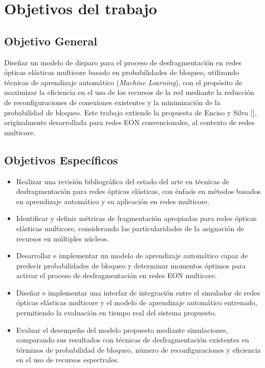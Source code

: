 \section{Objetivos del trabajo}
\subsection{Objetivo General}
Diseñar un modelo de disparo para el proceso de desfragmentación en redes ópticas elásticas multicore basado en probabilidades de bloqueo, utilizando técnicas de aprendizaje automático (\textit{Machine Learning}), con el propósito de maximizar la eficiencia en el uso de los recursos de la red mediante la reducción de reconfiguraciones de conexiones existentes y la minimización de la probabilidad de bloqueo. Este trabajo extiende la propuesta de Enciso y Silva [], originalmente desarrollada para redes EON convencionales, al contexto de redes multicore. 

\subsection{Objetivos Específicos}
\begin{itemize}
    \item Realizar una revisión bibliográfica del estado del arte en técnicas de desfragmentación para redes ópticas elásticas, con énfasis en métodos basados en aprendizaje automático y su aplicación en redes multicore.

    \item Identificar y definir métricas de fragmentación apropiadas para redes ópticas elásticas multicore, considerando las particularidades de la asignación de recursos en múltiples núcleos.
    
    \item Desarrollar e implementar un modelo de aprendizaje automático capaz de predecir probabilidades de bloqueo y determinar momentos óptimos para activar el proceso de desfragmentación en redes EON multicore.
    
    \item Diseñar e implementar una interfaz de integración entre el simulador de redes ópticas elásticas multicore y el modelo de aprendizaje automático entrenado, permitiendo la evaluación en tiempo real del sistema propuesto.
    
    \item Evaluar el desempeño del modelo propuesto mediante simulaciones, comparando sus resultados con técnicas de desfragmentación existentes en términos de probabilidad de bloqueo, número de reconfiguraciones y eficiencia en el uso de recursos espectrales.
\end{itemize}

